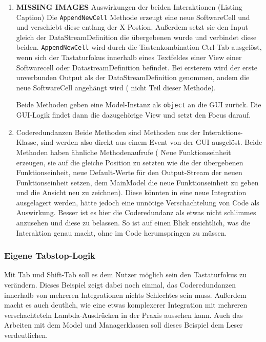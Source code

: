 \documentclass[11pt]{article}
\begin{document}
\begin{enumerate}
\item {\bfseries\sffamily MISSING IMAGES} Auswirkungen der beiden Interaktionen (Listing Caption)
\label{sec:orgheadline24}
Die \texttt{AppendNewCell} Methode erzeugt eine neue SoftwareCell und und
verschiebt diese entlang der X Postion.
Außerdem setzt sie den Input gleich der DataStreamDefinition die
übergebenen wurde und verbindet diese beiden.
\texttt{AppendNewCell} wird durch die Tastenkombination Ctrl-Tab ausgelöst, wenn
sich der Tastaturfokus innerhalb eines Textfeldes einer View einer Softwarecell oder
DatastreamDefinition befindet. Bei ersterem wird der erste unverbunden Output als der
DataStreamDefinition genommen, andem die neue SoftwareCell angehängt wird (
nicht Teil dieser Methode).

Beide Methoden geben eine
Model-Instanz als \texttt{object} an die GUI zurück. Die GUI-Logik findet dann die
dazugehörige View und setzt den Focus darauf.

\item Coderedundanzen
\label{sec:orgheadline25}
Beide Methoden sind Methoden aus der Interaktions-Klasse, sind werden also
direkt aus einem Event von der GUI ausgelöst. 
Beide Methoden haben ähnliche Methodenaufrufe ( Neue Funktionseinheit
erzeugen, sie auf die gleiche Position zu setzten wie die der übergebenen
Funktionseinheit, neue Default-Werte für den Output-Stream der neuen
Funktionseinheit setzen, dem MainModel die neue Funktionseinheit zu geben
und die Ansicht neu zu zeichnen). Diese könnten in eine neue
Integration ausgelagert werden, hätte jedoch eine unnötige
Verschachtelung von Code als Auswirkung. Besser ist es hier die
Coderedundanz als etwas nicht schlimmes anzusehen und diese zu belassen.
So ist auf einen Blick ersichtlich, was die Interaktion genau macht, ohne
im Code herumspringen zu müssen.
\end{enumerate}

\subsubsection{Eigene Tabstop-Logik}
\label{sec:orgheadline31}
Mit Tab und Shift-Tab soll es dem Nutzer möglich sein den Tastaturfokus zu
verändern. Dieses Beispiel zeigt dabei noch einmal, das Coderedundanzen innerhalb
von mehreren Integrationen nichts Schlechtes sein muss.
Außerdem macht es auch deutlich, wie eine etwas komplexerer Integration mit
mehreren verschachteteln Lambda-Ausdrücken in der Praxis aussehen kann.
Auch das Arbeiten mit dem Model und Managerklassen soll
dieses Beispiel dem Leser verdeutlichen.
\end{document}
